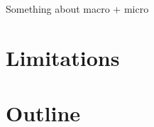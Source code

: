 {
    \color{BrickRed}
    \noindent
    \newline
    Something about macro + micro
}

\section{Limitations}

\section{Outline}

